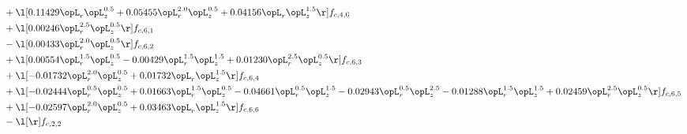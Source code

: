 \begin{alignat}{2}
& + \l[  0.11429 \opL_r \opL_z^{0.5} +  0.05455 \opL_r^{2.0} \opL_z^{0.5} +  0.04156 \opL_r \opL_z^{1.5}  \r] f_{c,4,6} \nonumber \\ 
& + \l[  0.00246 \opL_r^{2.5} \opL_z^{0.5}  \r] f_{c,6,1} \nonumber \\ 
& - \l[  0.00433 \opL_r^{2.0} \opL_z^{0.5}  \r] f_{c,6,2} \nonumber \\ 
& + \l[  0.00554 \opL_r^{1.5} \opL_z^{0.5}   -0.00429 \opL_r^{1.5} \opL_z^{1.5} +  0.01230 \opL_r^{2.5} \opL_z^{0.5}  \r] f_{c,6,3} \nonumber \\ 
& + \l[  -0.01732 \opL_r^{2.0} \opL_z^{0.5} +  0.01732 \opL_r \opL_z^{1.5}  \r] f_{c,6,4} \nonumber \\ 
& + \l[  -0.02444 \opL_r^{0.5} \opL_z^{0.5} +  0.01663 \opL_r^{1.5} \opL_z^{0.5}   -0.04661 \opL_r^{0.5} \opL_z^{1.5}   -0.02943 \opL_r^{0.5} \opL_z^{2.5}   -0.01288 \opL_r^{1.5} \opL_z^{1.5} +  0.02459 \opL_r^{2.5} \opL_z^{0.5}  \r] f_{c,6,5} \nonumber \\ 
& + \l[  -0.02597 \opL_r^{2.0} \opL_z^{0.5} +  0.03463 \opL_r \opL_z^{1.5}  \r] f_{c,6,6} \nonumber \\ 
& - \l[  \r] f_{c,2,2} \nonumber \\ 
\end{alignat} 


